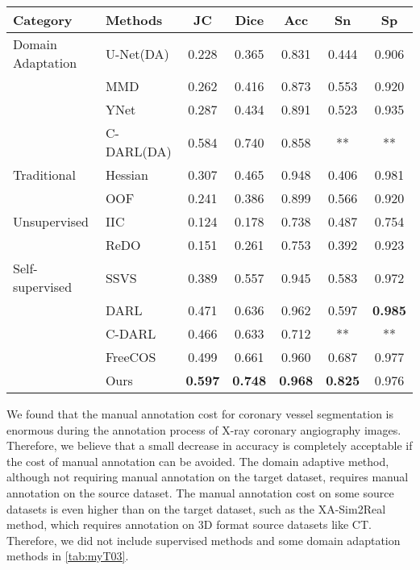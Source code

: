 \begin{table*}[h]
    \centering
    \caption{Quantitative evaluation of Our Method compared with different methods on the XCAD dataset}
    \label{tab:quantitative}
    \begin{tabular}{llccccc}
    \toprule
    \textbf{Category} & \textbf{Methods} & \textbf{JC} & \textbf{Dice} & \textbf{Acc} & \textbf{Sn} & \textbf{Sp} \\
    \midrule
    
    \multirow{}{}{Domain Adaptation} 
    & U-Net(DA) & 0.228 & 0.365 & 0.831 & 0.444 & 0.906 \\
    & MMD & 0.262 & 0.416 & 0.873 & 0.553 & 0.920 \\
    & YNet & 0.287 & 0.434 & 0.891 & 0.523 & 0.935 \\
    & C-DARL(DA) & 0.584 & 0.740 & 0.858 & ** & ** \\
    
    \midrule
    
    \multirow{}{}{Traditional} 
    & Hessian & 0.307 & 0.465 & 0.948 & 0.406 & 0.981 \\
    & OOF & 0.241 & 0.386 & 0.899 & 0.566 & 0.920 \\
    
    \midrule
    
    \multirow{}{}{Unsupervised} 
    & IIC & 0.124 & 0.178 & 0.738 & 0.487 & 0.754 \\
    & ReDO & 0.151 & 0.261 & 0.753 & 0.392 & 0.923 \\
    
    \midrule
    
    \multirow{}{}{Self-supervised} 
    & SSVS & 0.389 & 0.557 & 0.945 & 0.583 & 0.972 \\
    & DARL & 0.471 & 0.636 & 0.962 & 0.597 & \textbf{0.985} \\
    & C-DARL & 0.466 & 0.633 & 0.712 & ** & ** \\
    & FreeCOS & 0.499 & 0.661 & 0.960 & 0.687 & 0.977 \\
    & Ours & \textbf{0.597} & \textbf{0.748} & \textbf{0.968} & \textbf{0.825} & 0.976 \\
    
    \bottomrule
    \end{tabular}
    \label{tab:myT03}
\end{table*}

We found that the manual annotation cost for coronary vessel segmentation is enormous during the annotation process of X-ray coronary angiography images. Therefore, we believe that a small decrease in accuracy is completely acceptable if the cost of manual annotation can be avoided. The domain adaptive method, although not requiring manual annotation on the target dataset, requires manual annotation on the source dataset. 
The manual annotation cost on some source datasets is even higher than on the target dataset, 
such as the XA-Sim2Real \cite{00.01.XA-Sim2Real} method, 
which requires annotation on 3D format source datasets like CT. 
Therefore, we did not include supervised methods and some domain adaptation methods in \cref{tab:myT03}.

